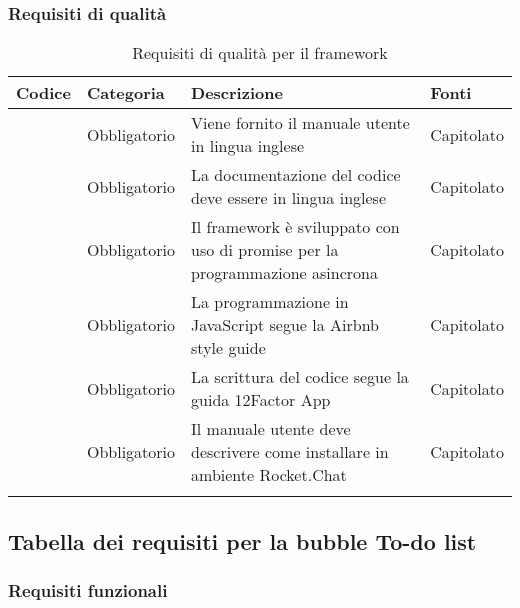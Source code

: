 \subsubsection{Requisiti di qualità}

\begin{longtable}{|P{1.5cm}|P{2.5cm}|P{6.5cm}|P{2.5cm}|}
	\hline \textbf{Codice} & \textbf{Categoria} & \textbf{Descrizione} & \textbf{Fonti} \\
	\hline \RequisitoObQ\label{L57} & Obbligatorio & Viene fornito il manuale utente in lingua inglese & Capitolato \\
	\hline \RequisitoObQ\label{L66} & Obbligatorio & La documentazione del codice deve essere in lingua inglese & Capitolato \\
	\hline \RequisitoObQ\label{L58} & Obbligatorio & Il framework è sviluppato con uso di promise per la programmazione asincrona & Capitolato \\
	\hline \RequisitoObQ\label{L59} & Obbligatorio & La programmazione in JavaScript segue la Airbnb style guide & Capitolato \\
	\hline \RequisitoObQ\label{L60} & Obbligatorio & La scrittura del codice segue la guida 12Factor App & Capitolato \\
	\hline \RequisitoObQ\label{L67} & Obbligatorio & Il manuale utente deve descrivere come installare \ProjectName{} in ambiente Rocket.Chat & Capitolato \\
	\hline
\caption{Requisiti di qualità per il framework}
\end{longtable}


\subsection{Tabella dei requisiti per la bubble To-do list}

\subsubsection{Requisiti funzionali}

